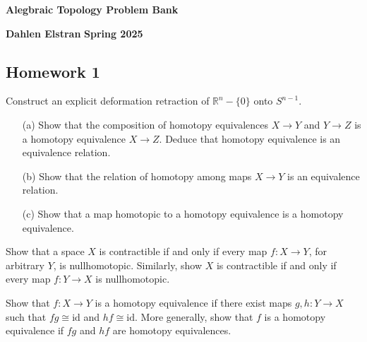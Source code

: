\documentclass[12pt]{article}
\begin{document}
\begin{newtitle}
  \begin{center}
    \textbf{\Huge Alegbraic Topology Problem Bank}
  \end{center}
  \textbf{Dahlen Elstran} \hfill \textbf{Spring 2025}
\end{newtitle}

\begin{center} \section*{Homework 1} \end{center}

\begin{hatcher}[0.2]
    Construct an explicit deformation retraction of $\mathbb{R}^n - \{0\}$ onto $S^{n-1}$.
\end{hatcher}

\begin{hatcher}[0.3]
    \begin{itemize}
        \item[(a)] Show that the composition of homotopy equivalences $X \to Y$ and $Y \to Z$ is a homotopy equivalence $X \to Z$. Deduce that homotopy equivalence is an equivalence relation.

        \item[(b)] Show that the relation of homotopy among maps $X \to Y$ is an equivalence relation.

        \item[(c)] Show that a map homotopic to a homotopy equivalence is a homotopy equivalence.
    \end{itemize}
\end{hatcher}

\begin{hatcher}[0.6]
    
\end{hatcher}

\begin{hatcher}[0.10]
    Show that a space $X$ is contractible if and only if every map $f:X \to Y$, for arbitrary $Y$, is nullhomotopic. Similarly, show $X$ is contractible if and only if every map $f: Y \to X$ is nullhomotopic.
\end{hatcher}

\begin{hatcher}[0.11]
    Show that $f: X \to Y$ is a homotopy equivalence if there exist maps $g,h:Y \to X$ such that $fg \cong \text{id}$ and $hf \cong \text{id}$. More generally, show that $f$ is a homotopy equivalence if $fg$ and $hf$ are homotopy equivalences. 
\end{hatcher}
\end{document}
